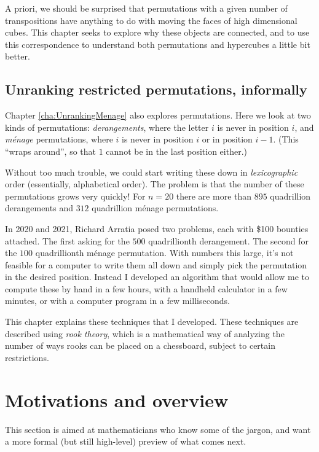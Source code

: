 A priori, we should be surprised that permutations with a given number of
transpositions have anything to do with moving the faces of high dimensional
cubes. This chapter seeks to explore why these objects are connected, and
to use this correspondence to understand both permutations and hypercubes a
little bit better.

\subsection{Unranking restricted permutations, informally}
Chapter \ref{cha:UnrankingMenage} also explores permutations. Here we look at
two kinds of permutations: \textit{derangements}, where the letter $i$ is never
in position $i$, and \textit{m\'enage} permutations, where $i$ is never in
position $i$ or in position $i - 1$.
(This ``wraps around'', so that $1$ cannot be in the last position either.)

Without too much trouble, we could start writing these down in
\textit{lexicographic} order (essentially, alphabetical order). The
problem is that the number of these permutations grows very quickly! For
$n=20$ there are more than $895$ quadrillion derangements and
$312$ quadrillion m\'enage permutations.

In 2020 and 2021, Richard Arratia posed two problems, each with \$100 bounties
attached. The first asking for the $500$ quadrillionth derangement. The
second for the $100$ quadrillionth m\'enage permutation.
With numbers this large, it's not feasible for a computer to
write them all down and simply pick the permutation in the desired position.
Instead I developed an algorithm that would allow me to compute these by hand in
a few hours, with a handheld calculator in a few minutes, or with a computer
program in a few milliseconds.

This chapter explains these techniques that I developed. These techniques are
described using \textit{rook theory}, which is a mathematical way of analyzing
the number of ways rooks can be placed on a chessboard, subject to certain
restrictions.

\section{Motivations and overview}
This section is aimed at mathematicians who know some of the jargon, and want
a more formal (but still high-level) preview of what comes next.

